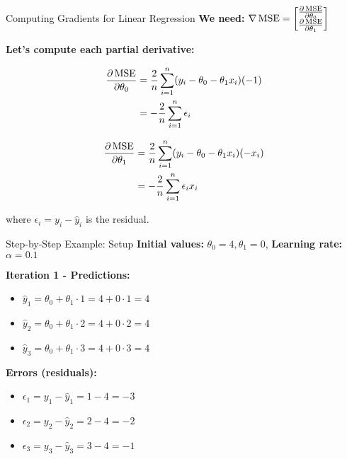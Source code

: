 \documentclass[usenames,dvipsnames]{beamer}
\begin{document}
  \begin{frame}{Computing Gradients for Linear Regression}
    \textbf{We need:} $\nabla \operatorname{MSE} = \begin{bmatrix} \frac{\partial \operatorname{MSE}}{\partial \theta_0} \\ \frac{\partial \operatorname{MSE}}{\partial \theta_1} \end{bmatrix}$
    
    \pause
    \textbf{Let's compute each partial derivative:}
    
    \begin{align}
        \frac{\partial \operatorname{MSE}}{\partial \theta_0} &= \frac{2}{n}\sum_{i=1}^n (y_i - \theta_0 - \theta_1 x_i)(-1)\\
        &= -\frac{2}{n}\sum_{i=1}^n \epsilon_i
    \end{align}
    
    \pause
    \begin{align}
        \frac{\partial \operatorname{MSE}}{\partial \theta_1} &= \frac{2}{n}\sum_{i=1}^n (y_i - \theta_0 - \theta_1 x_i)(-x_i)\\
        &= -\frac{2}{n}\sum_{i=1}^n \epsilon_i x_i
    \end{align}
    
    where $\epsilon_i = y_i - \hat{y}_i$ is the residual.
  \end{frame}

  \begin{frame}{Step-by-Step Example: Setup}
    \textbf{Initial values:} $\theta_0 = 4, \theta_1 = 0$, \textbf{Learning rate:} $\alpha = 0.1$
    
    \pause
    \textbf{Iteration 1 - Predictions:}
    \begin{itemize}[<+->]
        \item $\hat{y}_1 = \theta_0 + \theta_1 \cdot 1 = 4 + 0 \cdot 1 = 4$
        \item $\hat{y}_2 = \theta_0 + \theta_1 \cdot 2 = 4 + 0 \cdot 2 = 4$ 
        \item $\hat{y}_3 = \theta_0 + \theta_1 \cdot 3 = 4 + 0 \cdot 3 = 4$
    \end{itemize}
    
    \pause
    \textbf{Errors (residuals):}
    \begin{itemize}[<+->]
        \item $\epsilon_1 = y_1 - \hat{y}_1 = 1 - 4 = -3$
        \item $\epsilon_2 = y_2 - \hat{y}_2 = 2 - 4 = -2$
        \item $\epsilon_3 = y_3 - \hat{y}_3 = 3 - 4 = -1$
    \end{itemize}
  \end{frame}
\end{document}
